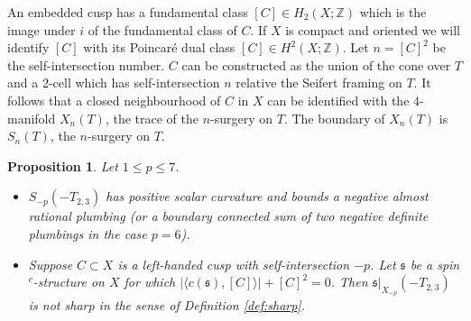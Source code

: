 \documentclass{amsart}
\newtheorem{proposition}[theorem]{Proposition}
\theoremstyle{definition}
\theoremstyle{remark}
\numberwithin{equation}{section}
\begin{document}
An embedded cusp has a fundamental class $[C] \in H_2( X ; \mathbb{Z})$ which is the image under $i$ of the fundamental class of $C$. If $X$ is compact and oriented we will identify $[C]$ with its Poincar\'e dual class $[C] \in H^2(X ; \mathbb{Z})$. Let $n = [C]^2$ be the self-intersection number. $C$ can be constructed as the union of the cone over $T$ and a $2$-cell which has self-intersection $n$ relative the Seifert framing on $T$. It follows that a closed neighbourhood of $C$ in $X$ can be identified with the $4$-manifold $X_{n}(T)$, the trace of the $n$-surgery on $T$. The boundary of $X_n(T)$ is $S_n(T)$, the $n$-surgery on $T$.

\begin{proposition}\label{prop:E8-p}
Let $1 \le p \le 7$. 
\begin{itemize}
\item[(1)]{$S_{-p}(-T_{2,3})$ has positive scalar curvature and bounds a negative almost rational plumbing (or a boundary connected sum of two negative definite plumbings in the case $p=6$).}
\item[(2)]{Suppose $C \subset X$ is a left-handed cusp with self-intersection $-p$. Let $\mathfrak{s}$ be a spin$^c$-structure on $X$ for which $| \langle c(\mathfrak{s}) , [C] \rangle | + [C]^2 = 0$. Then $\mathfrak{s}|_{X_{-p}}(-T_{2,3})$ is not sharp in the sense of Definition \ref{def:sharp}.}
\end{itemize}
\end{proposition}
\end{document}

